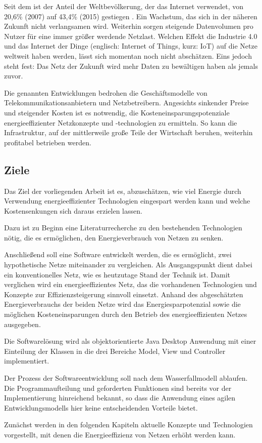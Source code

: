 Seit dem ist der Anteil der Weltbevölkerung, der das Internet verwendet, von 20,6\% (2007) auf 43,4\% (2015) gestiegen \cite{itu}. Ein Wachstum, das sich in der näheren Zukunft nicht verlangsamen wird. Weiterhin sorgen steigende Datenvolumen pro Nutzer für eine immer größer werdende Netzlast. Welchen Effekt die Industrie 4.0 und das Internet der Dinge (englisch: Internet of Things, kurz: IoT) auf die Netze weltweit haben werden, lässt sich momentan  noch nicht abschätzen. Eins jedoch steht fest: Das Netz der Zukunft wird mehr Daten zu bewältigen haben als jemals zuvor.

Die genannten Entwicklungen bedrohen die Geschäftsmodelle von Telekommunikationsanbietern und Netzbetreibern. Angesichts sinkender Preise und steigender Kosten ist es notwendig, die  Kosteneinsparungspotenziale energieeffizienter Netzkonzepte und -technologien zu ermitteln. So kann die Infrastruktur, auf der mittlerweile große Teile der Wirtschaft beruhen, weiterhin profitabel betrieben werden.

\subsection{Ziele}
Das Ziel der vorliegenden Arbeit ist es, abzuschätzen, wie viel Energie  durch Verwendung energieeffizienter Technologien eingespart werden kann und welche Kostensenkungen sich daraus erzielen lassen.

Dazu ist zu Beginn eine Literaturrecherche zu den bestehenden Technologien nötig, die es ermöglichen, den Energieverbrauch von Netzen zu senken.

Anschließend soll eine Software entwickelt werden, die es ermöglicht, zwei hypothetische Netze miteinander zu vergleichen. Als Ausgangspunkt dient dabei ein konventionelles Netz, wie es heutzutage Stand der Technik ist. Damit verglichen wird ein energieeffizientes Netz, das die vorhandenen Technologien und Konzepte zur Effizienzsteigerung sinnvoll einsetzt. Anhand des abgeschätzten Energieverbrauchs der beiden Netze wird das Energiesparpotenzial sowie die möglichen Kosteneinsparungen durch den Betrieb des energieeffizienten Netzes ausgegeben. 

Die Softwarelösung wird als objektorientierte Java Desktop Anwendung mit einer Einteilung der Klassen in die drei Bereiche Model, View und Controller implementiert.

Der Prozess der Softwareentwicklung soll nach dem Wasserfallmodell ablaufen. Die Programmaufteilung und geforderten Funktionen sind bereits vor der Implementierung hinreichend bekannt, so dass die Anwendung eines agilen Entwicklungsmodells hier keine entscheidenden Vorteile bietet. 

Zunächst werden in den folgenden Kapiteln aktuelle Konzepte und Technologien vorgestellt, mit denen die Energieeffizienz von Netzen erhöht werden kann.
